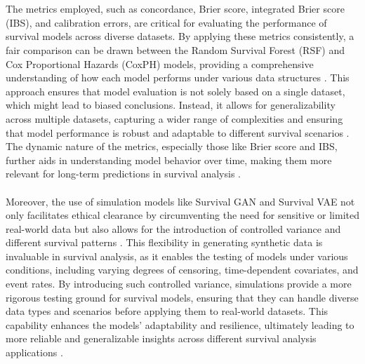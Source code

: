 \\\\
\noindent The metrics employed, such as concordance, Brier score, integrated Brier score (IBS), and calibration errors, are critical for evaluating the performance of survival models across diverse datasets. By applying these metrics consistently, a fair comparison can be drawn between the Random Survival Forest (RSF) and Cox Proportional Hazards (CoxPH) models, providing a comprehensive understanding of how each model performs under various data structures \parencite{harrell__regression_2015}. This approach ensures that model evaluation is not solely based on a single dataset, which might lead to biased conclusions. Instead, it allows for generalizability across multiple datasets, capturing a wider range of complexities and ensuring that model performance is robust and adaptable to different survival scenarios \parencite{tibshirani_regression_1996}. The dynamic nature of the metrics, especially those like Brier score and IBS, further aids in understanding model behavior over time, making them more relevant for long-term predictions in survival analysis \parencite{qi_survivaleval_2024}.
\\\\
\noindent Moreover, the use of simulation models like Survival GAN and Survival VAE not only facilitates ethical clearance by circumventing the need for sensitive or limited real-world data but also allows for the introduction of controlled variance and different survival patterns \parencite{norcliffe_survivalgan_2023}. This flexibility in generating synthetic data is invaluable in survival analysis, as it enables the testing of models under various conditions, including varying degrees of censoring, time-dependent covariates, and event rates. By introducing such controlled variance, simulations provide a more rigorous testing ground for survival models, ensuring that they can handle diverse data types and scenarios before applying them to real-world datasets. This capability enhances the models' adaptability and resilience, ultimately leading to more reliable and generalizable insights across different survival analysis applications \parencite{qian_synthcity_2023}.